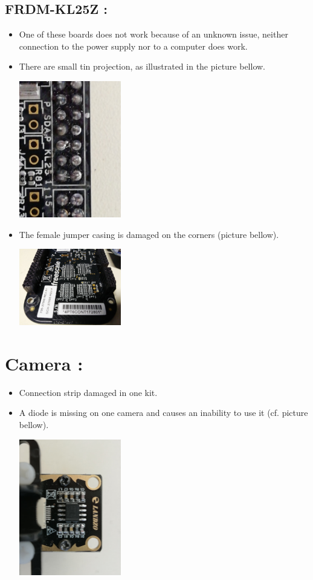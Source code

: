 \documentclass[12pt]{report}
\begin{document}
\subsection*{FRDM-KL25Z :}
\begin{itemize}
	\item One of these boards does not work because of an unknown issue, neither connection to the power supply nor to a computer does work.
	\item There are small tin projection, as illustrated in the picture bellow. 
	\begin{center}
		\includegraphics[width=0.35\textwidth]{tinballs.jpg}
	\end{center}
	\item The female jumper casing is damaged on the corners (picture bellow).
	\begin{center}
		\includegraphics[width=0.35\textwidth]{corner.jpg}
	\end{center}
\end{itemize}


\section*{Camera :}
\begin{itemize}
	\item Connection strip damaged in one kit.
	\item A diode is missing on one camera and causes an inability to use it (cf. picture bellow).
	\begin{center}
		\includegraphics[width=0.35\textwidth]{camera.jpg}
	\end{center}
\end{itemize}
\end{document}

